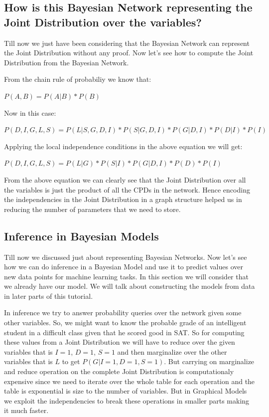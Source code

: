 \documentclass{article}
\begin{document}
\subsection{How is this Bayesian Network representing the Joint Distribution over the variables?}

Till now we just have been considering that the Bayesian Network can represent the Joint Distribution without any proof. Now let's see how to compute the Joint Distribution from the Bayesian Network.

From the chain rule of probabiliy we know that:

$P(A,B) = P(A | B) * P(B)$

Now in this case:

$P(D, I, G, L, S) = P(L | S, G, D, I) * P(S | G, D, I) * P(G | D, I) * P(D | I) * P(I)$

Applying the local independence conditions in the above equation we will get:

$P(D, I, G, L, S) = P(L | G) * P(S | I) * P(G | D, I) * P(D) * P(I)$

From the above equation we can clearly see that the Joint Distribution over all the variables is just the product of all the CPDs in the network. Hence encoding the independencies in the Joint Distribution in a graph structure helped us in reducing the number of parameters that we need to store.

\subsection{Inference in Bayesian Models}

Till now we discussed just about representing Bayesian Networks. Now let’s see how we can do inference in a Bayesian Model and use it to predict values over new data points for machine learning tasks. In this section we will consider that we already have our model. We will talk about constructing the models from data in later parts of this tutorial.

In inference we try to answer probability queries over the network given some other variables. So, we might want to know the probable grade of an intelligent student in a difficult class given that he scored good in SAT. So for computing these values from a Joint Distribution we will have to reduce over the given variables that is $ I = 1 $, $ D = 1 $, $ S = 1 $ and then marginalize over the other variables that is $ L $ to get $ P(G | I=1, D=1, S=1) $. But carrying on marginalize and reduce operation on the complete Joint Distribution is computationaly expensive since we need to iterate over the whole table for each operation and the table is exponential is size to the number of variables. But in Graphical Models we exploit the independencies to break these operations in smaller parts making it much faster.
\end{document}
